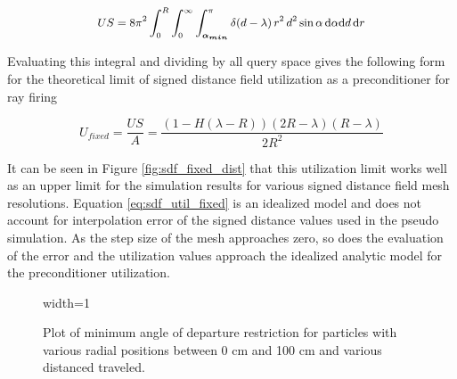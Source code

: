\begin{equation}
\small US = 8\pi^2  \int_{0}^{R}\int_{0}^{\infty}\int_{\boldsymbol{\alpha_{min}}}^{\pi} \delta(d-\lambda) \,
r^2 \, d^2 \sin{\alpha} \, \mathrm{d}\alpha \mathrm{d}d \, \mathrm{d}r
\label{eq:subs_a_cond}
\end{equation}

Evaluating this integral and dividing by all query space gives the
following form for the theoretical limit of signed distance field utilization as a
preconditioner for ray firing

\begin{equation}
  U_{fixed} = \frac{US}{A} =  \frac{(1-H(\lambda-R))(2R-\lambda)(R-\lambda)}{2R^2}
  \label{eq:sdf_util_fixed}
\end{equation}

It can be seen in Figure \ref{fig:sdf_fixed_dist} that this utilization limit
works well as an upper limit for the simulation results for various signed
distance field mesh resolutions. Equation \eqref{eq:sdf_util_fixed} is an
idealized model and does not account for interpolation error of the signed
distance values used in the pseudo simulation. As the step size of the mesh
approaches zero, so does the evaluation of the error and the utilization values
approach the idealized analytic model for the preconditioner utilization.


\begin{figure}[H]
  \centering
  {width=1\textwidth}
  \caption[Plot of $\alpha_{min}$ condition.]{Plot of minimum angle of departure
    restriction for particles with various radial positions between 0 cm and 100
    cm and various distanced traveled.}
 \label{fig:alpha_min}
\end{figure}


